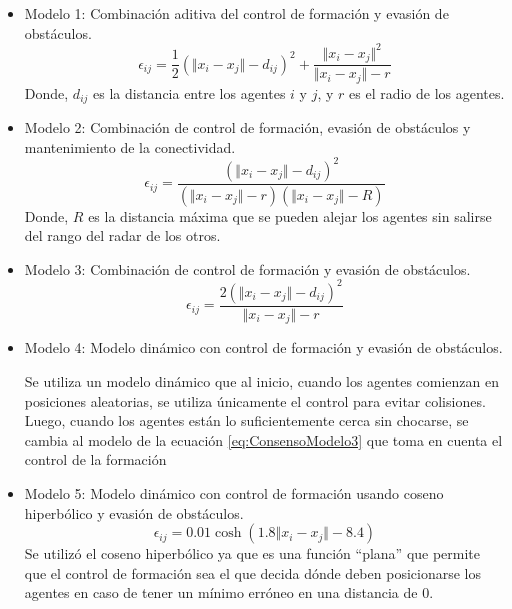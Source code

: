 \begin{itemize}
	\item Modelo 1: Combinación aditiva del control de formación y evasión de obstáculos.
	\begin{equation}
		\epsilon_{ij} = \frac{1}{2}(\Vert x_i - x_j \Vert - d_{ij})^2 + \frac{\Vert x_i - x_j \Vert^2}{\Vert x_i - x_j \Vert - r}
		\label{eq:ConsensoModelo1}
	\end{equation}
	Donde, $d_{ij}$ es la distancia entre los agentes $i$ y $j$, y $r$ es el radio de los agentes.
	
	\item Modelo 2: Combinación de control de formación, evasión de obstáculos y mantenimiento de la conectividad.
	\begin{equation}
		\epsilon_{ij} = \frac{(\Vert x_i - x_j \Vert - d_{ij})^2}{(\Vert x_i - x_j \Vert - r)(\Vert x_i - x_j \Vert - R)}
		\label{eq:ConsensoModelo2}
	\end{equation}
	Donde, $R$ es la distancia máxima que se pueden alejar los agentes sin salirse del rango del radar de los otros.
	
	\item Modelo 3: Combinación de control de formación y evasión de obstáculos.
	\begin{equation}
		\epsilon_{ij} = \frac{2(\Vert x_i - x_j \Vert - d_{ij})^2}{\Vert x_i - x_j \Vert - r}
		\label{eq:ConsensoModelo3}
	\end{equation}
	
	\item Modelo 4: Modelo dinámico con control de formación y evasión de obstáculos.\par
	
	Se utiliza un modelo dinámico que al inicio, cuando los agentes comienzan en posiciones aleatorias, se utiliza únicamente el control para evitar colisiones. Luego, cuando los agentes están lo suficientemente cerca sin chocarse, se cambia al modelo de la ecuación \ref{eq:ConsensoModelo3} que toma en cuenta el control de la formación 
	
	\item Modelo 5: Modelo dinámico con control de formación usando coseno hiperbólico y evasión de obstáculos.
	\begin{equation}
		\epsilon_{ij} = 0.01\cosh{(1.8 \Vert x_i - x_j \Vert - 8.4)}
		\label{eq:ConsensoModelo5}
	\end{equation}
	Se utilizó el coseno hiperbólico ya que es una función ``plana'' que permite que el control de formación sea el que decida dónde deben posicionarse los agentes en caso de tener un mínimo erróneo en una distancia de 0.
	

\end{itemize}
